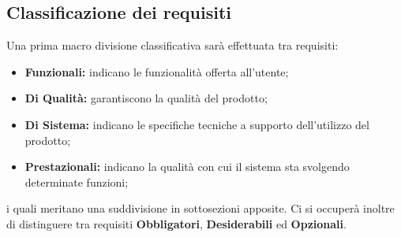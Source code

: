 \subsection{Classificazione dei requisiti}
Una prima macro divisione classificativa sarà effettuata tra requisiti:
\begin{itemize}
    \item \textbf{Funzionali: }indicano le funzionalità offerta all'utente;
    \item \textbf{Di Qualità: }garantiscono la qualità del prodotto;
    \item \textbf{Di Sistema: }indicano le specifiche tecniche a supporto dell'utilizzo del prodotto;
    \item \textbf{Prestazionali: }indicano la qualità con cui il sistema sta svolgendo determinate funzioni;
\end{itemize}
i quali meritano una suddivisione in sottosezioni apposite.
Ci si occuperà inoltre di distinguere tra requisiti \textbf{Obbligatori}, \textbf{Desiderabili} ed \textbf{Opzionali}.

